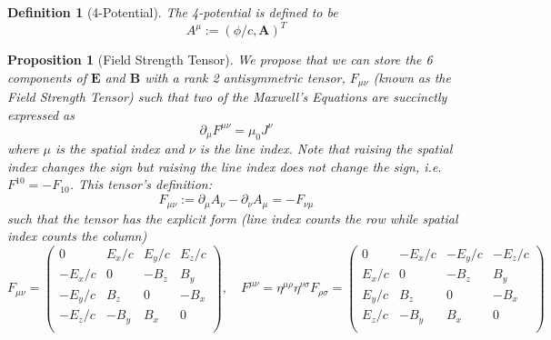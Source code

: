\documentclass[a4paper]{article}
\theoremstyle{new}
\newtheorem{defi}{Definition}[section]
\newtheorem{prop}{Proposition}[section]
\begin{document}
\begin{defi}[4-Potential]
The 4-potential is defined to be
$$A^\mu:=(\phi/c,\mathbf{A})^T$$
\end{defi}
\begin{prop}[Field Strength Tensor]
We propose that we can store the 6 components of $\mathbf{E}$ and $\mathbf{B}$ with a rank 2 antisymmetric tensor, $F_{\mu\nu}$ (known as the Field Strength Tensor) such that two of the Maxwell's Equations are succinctly expressed as
$$\partial_\mu F^{\mu\nu}=\mu_0J^\nu$$
where $\mu$ is the spatial index and $\nu$ is the line index. Note that raising the spatial index changes the sign but raising the line index does not change the sign, i.e. $F^{10}=-F_{10}$. This tensor's definition:
$$F_{\mu\nu}:=\partial_\mu A_\nu-\partial_\nu A_\mu=-F_{\nu\mu}$$
such that the tensor has the explicit form (line index counts the row while spatial index counts the column)
$$F_{\mu\nu}=\begin{pmatrix}0&E_x/c&E_y/c&E_z/c\\-E_x/c&0&-B_z&B_y\\-E_y/c&B_z&0&-B_x\\-E_z/c&-B_y&B_x&0\\\end{pmatrix},\quad F^{\mu\nu}=\eta^{\mu\rho}\eta^{\nu\sigma}F_{\rho\sigma}=\begin{pmatrix}0&-E_x/c&-E_y/c&-E_z/c\\E_x/c&0&-B_z&B_y\\E_y/c&B_z&0&-B_x\\E_z/c&-B_y&B_x&0\\\end{pmatrix}$$
\end{prop}
\end{document}
